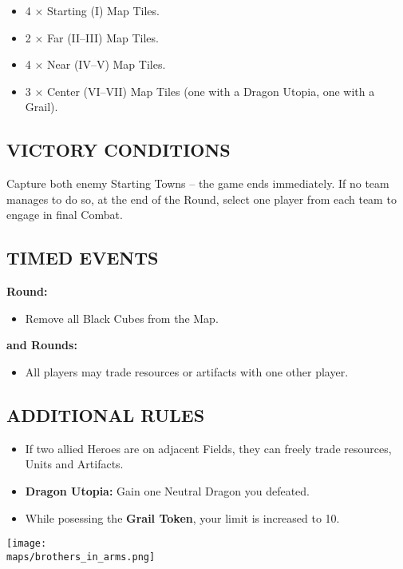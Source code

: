 \begin{multicols*}{2}
\begin{itemize}
  \item 4 × Starting (I) Map Tiles.
  \item 2 × Far (II–III) Map Tiles.
  \item 4 × Near (IV–V) Map Tiles.
  \item 3 × Center (VI–VII) Map Tiles (one with a Dragon Utopia, one with a Grail).
\end{itemize}

\subsection*{\MakeUppercase{Victory Conditions}}
Capture both enemy Starting Towns -- the game ends immediately.
If no team manages to do so, at the end of the  Round, select one player from each team to engage in final Combat.

\subsection*{\MakeUppercase{Timed Events}}
\textbf{ Round:}
\begin{itemize}
  \item Remove all Black Cubes from the Map.
\end{itemize}
\textbf{ and  Rounds:}
\begin{itemize}
  \item All players may trade resources or artifacts with one other player.
\end{itemize}

\subsection*{\MakeUppercase{Additional Rules}}
\begin{itemize}
  \item If two allied Heroes are on adjacent Fields, they can freely trade resources, Units and Artifacts.
  \item \textbf{Dragon Utopia:} Gain one Neutral Dragon you defeated.
  \item While posessing the \textbf{Grail Token}, your  limit is increased to 10.
\end{itemize}

\vspace*{\fill}
\hspace*{-1.5em}\texttt{[image: \\maps/brothers\_in\_arms.png]}
\end{multicols*}
